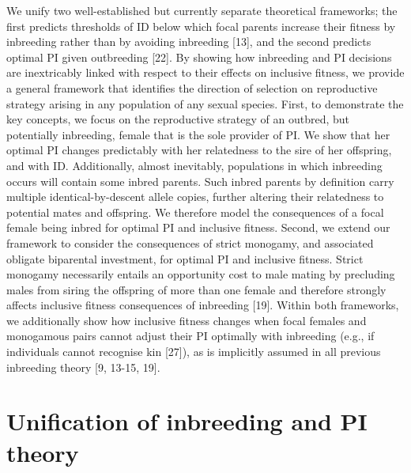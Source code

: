 \documentclass[12pt]{article}
\begin{document}
We unify two well-established but currently separate theoretical frameworks; the first predicts thresholds of ID below which focal parents increase their fitness by inbreeding rather than by avoiding inbreeding [13], and the second predicts optimal PI given outbreeding [22]. By showing how inbreeding and PI decisions are inextricably linked with respect to their effects on inclusive fitness, we provide a general framework that identifies the direction of selection on reproductive strategy arising in any population of any sexual species. First, to demonstrate the key concepts, we focus on the reproductive strategy of an outbred, but potentially inbreeding, female that is the sole provider of PI. We show that her optimal PI changes predictably with her relatedness to the sire of her offspring, and with ID. Additionally, almost inevitably, populations in which inbreeding occurs will contain some inbred parents. Such inbred parents by definition carry multiple identical-by-descent allele copies, further altering their relatedness to potential mates and offspring. We therefore model the consequences of a focal female being inbred for optimal PI and inclusive fitness. Second, we extend our framework to consider the consequences of strict monogamy, and associated obligate biparental investment, for optimal PI and inclusive fitness. Strict monogamy necessarily entails an opportunity cost to male mating by precluding males from siring the offspring of more than one female and therefore strongly affects inclusive fitness consequences of inbreeding [19]. Within both frameworks, we additionally show how inclusive fitness changes when focal females and monogamous pairs cannot adjust their PI optimally with inbreeding (e.g., if individuals cannot recognise kin [27]), as is implicitly assumed in all previous inbreeding theory [9, 13-15, 19].

\section*{Unification of inbreeding and PI theory}
\end{document}
